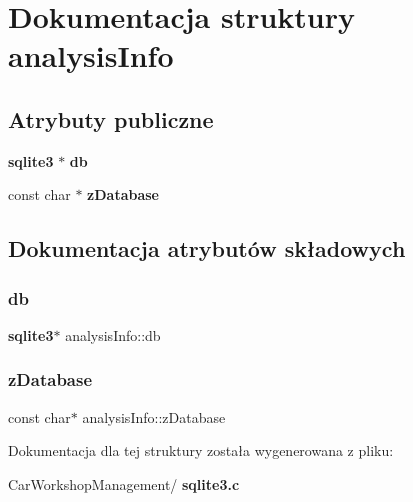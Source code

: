 \section{Dokumentacja struktury analysis\+Info}
\label{structanalysis_info}
\subsection*{Atrybuty publiczne}
\begin{DoxyCompactItemize}
\item 
\textbf{ sqlite3} $\ast$ \textbf{ db}
\item 
const char $\ast$ \textbf{ z\+Database}
\end{DoxyCompactItemize}


\subsection{Dokumentacja atrybutów składowych}
\mbox{\label{structanalysis_info_a13108eadc55ffe73a8825fb91cc0f9b5}} 
\subsubsection{db}
{\footnotesize\ttfamily \textbf{ sqlite3}$\ast$ analysis\+Info\+::db}

\mbox{\label{structanalysis_info_accbe3c1f5613ffa13b9578e58a5d850a}} 
\subsubsection{zDatabase}
{\footnotesize\ttfamily const char$\ast$ analysis\+Info\+::z\+Database}



Dokumentacja dla tej struktury została wygenerowana z pliku\+:\begin{DoxyCompactItemize}
\item 
Car\+Workshop\+Management/\textbf{ sqlite3.\+c}\end{DoxyCompactItemize}

